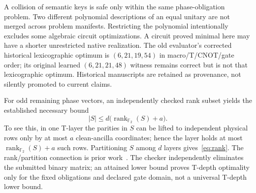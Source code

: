 \documentclass[11pt]{article}
\theoremstyle{definition}\newtheorem{definition}[theorem]{Definition}
\newcommand{\F}{\mathbb F_2}
\newcommand{\rank}{\operatorname{rank}_{\F}}
\begin{document}
A collision of semantic keys is safe only within the same phase-obligation problem. Two different polynomial descriptions of an equal unitary are not merged across problem manifests. Restricting the polynomial intentionally excludes some algebraic circuit optimizations. A circuit proved minimal here may have a shorter unrestricted native realization. The old evaluator's corrected historical lexicographic optimum is $(6,21,19,54)$ in macro/T/CNOT/gate order; its original learned $(6,21,21,48)$ witness remains correct but is not that lexicographic optimum. Historical manuscripts are retained as provenance, not silently promoted to current claims.

For odd remaining phase vectors, an independently checked rank subset yields the established necessary bound
\begin{equation}
|S|\le d\bigl(\rank(S)+a\bigr).
\label{eq:rank}
\end{equation}
To see this, in one T-layer the parities in $S$ can be lifted to independent physical rows only by at most $a$ clean-ancilla coordinates; hence the layer holds at most $\rank(S)+a$ such rows. Partitioning $S$ among $d$ layers gives~\eqref{eq:rank}. The rank/partition connection is prior work~\cite{amy2014}. The checker independently eliminates the submitted binary matrix; an attained lower bound proves T-depth optimality only for the fixed obligations and declared gate domain, not a universal T-depth lower bound.
\end{document}
